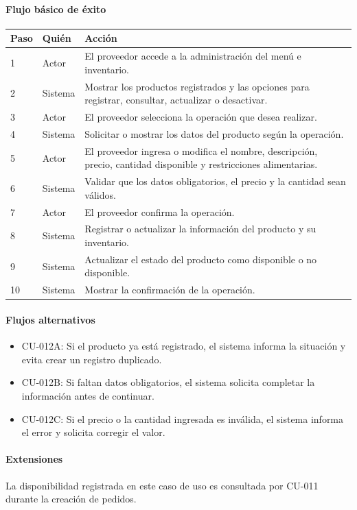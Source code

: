 \paragraph{Flujo básico de éxito}
\begin{longtable}{P{1.1cm}P{1.8cm}P{10.5cm}}
\toprule
\textbf{Paso} & \textbf{Quién} & \textbf{Acción}\\
\midrule
{} & Actor & El proveedor accede a la administración del menú e inventario.\\
2 & Sistema & Mostrar los productos registrados y las opciones para registrar, consultar, actualizar o desactivar.\\
3 & Actor & El proveedor selecciona la operación que desea realizar.\\
4 & Sistema & Solicitar o mostrar los datos del producto según la operación.\\
5 & Actor & El proveedor ingresa o modifica el nombre, descripción, precio, cantidad disponible y restricciones alimentarias.\\
6 & Sistema & Validar que los datos obligatorios, el precio y la cantidad sean válidos.\\
7 & Actor & El proveedor confirma la operación.\\
8 & Sistema & Registrar o actualizar la información del producto y su inventario.\\
9 & Sistema & Actualizar el estado del producto como disponible o no disponible.\\
10 & Sistema & Mostrar la confirmación de la operación.\\
\bottomrule
\end{longtable}

\paragraph{Flujos alternativos}
\begin{itemize}[leftmargin=1.4em, topsep=1pt]
  \item CU-012A: Si el producto ya está registrado, el sistema informa la situación y evita crear un registro duplicado.
  \item CU-012B: Si faltan datos obligatorios, el sistema solicita completar la información antes de continuar.
  \item CU-012C: Si el precio o la cantidad ingresada es inválida, el sistema informa el error y solicita corregir el valor.
\end{itemize}

\paragraph{Extensiones}
La disponibilidad registrada en este caso de uso es consultada por CU-011 durante la creación de pedidos.

